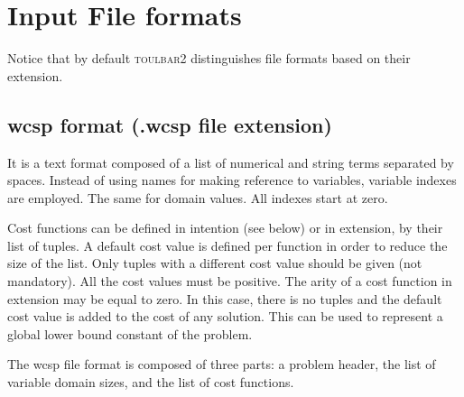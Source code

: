 \documentclass{article}
\def\toulbar2{\textsc{toulbar2}}
\begin{document}
\section{Input File formats}
\label{file-formats}
Notice that by default \toulbar2 distinguishes file formats based on their extension.
\subsection{wcsp format (.wcsp file extension)}

It is a text format composed of a list of numerical and string terms separated by spaces. Instead of using names for making reference to variables, variable indexes are employed. The same for domain values. All indexes start at zero.

Cost functions can be defined in intention (see below) or in extension, by their list of tuples. A default cost value is defined per function in order to reduce the size of the list. Only tuples with a different cost value should be given (not mandatory). All the cost values must be positive. The arity of a cost function in extension may be equal to zero. In this case, there is no tuples and the default cost value is added to the cost of any solution. This can be used to represent a global lower bound constant of the problem.

The wcsp file format is composed of three parts\-: a problem header, the list of variable domain sizes, and the list of cost functions.
\end{document}
